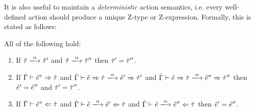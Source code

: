 \documentclass{llncs}
\begin{document}
It is also useful to maintain a \emph{deterministic} action semantics, i.e. every well-defined action should produce a unique Z-type or Z-expression. Formally, this is stated as follows:
\begin{theorem} All of the following hold:
\label{thrm:actdet}
\begin{enumerate}
\item If $\performTyp{\ztau}{\alpha}{\ztau'}$ and $\performTyp{\ztau}{\alpha}{\ztau''}$ then $\hat{\tau}'=\hat{\tau}''$.
\item If $\dot{\Gamma} \vdash \hat{e}^{\diamond} \Rightarrow \dot{\tau}$ and
  $\performSyn{\hGamma}{\zexp}{\htau}{\alpha}{\zexp'}{\htau'}$ and
  $\performSyn{\hGamma}{\zexp}{\htau}{\alpha}{\zexp''}{\htau''}$ then
  $\hat{e}' = \hat{e}''$ and $\dot{\tau}' = \dot{\tau}''$.

\item If $\dot{\Gamma} \vdash \hat{e}^{\diamond} \Leftarrow \dot{\tau}$ and
  $\performAna{\hGamma}{\zexp}{\htau}{\alpha}{\zexp'}$ and
  $\performAna{\hGamma}{\zexp}{\htau}{\alpha}{\zexp''}$ then $\hat{e}' =
  \hat{e}''$.
\end{enumerate}
\end{theorem}
\end{document}
